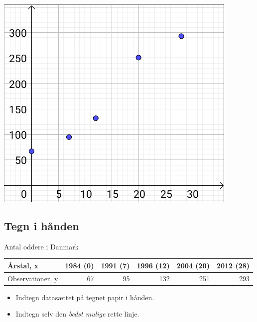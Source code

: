 \documentclass[11pt]{article}
\begin{document}
\begin{center}
\includegraphics[width=.9\linewidth]{img/screenshot_2019-09-05_09-29-54.png}
\end{center}

\subsection*{Tegn i hånden}
\label{sec:org1815f5c}

Antal oddere i Danmark

\begin{center}
\begin{tabular}{lrrrrr}
Årstal, x & 1984 (0) & 1991 (7) & 1996 (12) & 2004 (20) & 2012 (28)\\
\hline
Observationer, y & 67 & 95 & 132 & 251 & 293\\
\end{tabular}
\end{center}

\begin{itemize}
\item Indtegn datasættet på tegnet papir i hånden.
\item Indtegn selv den \emph{bedst mulige} rette linje.
\end{itemize}
\end{document}
